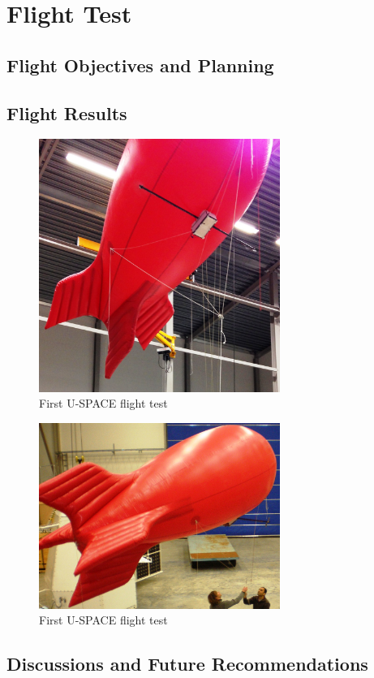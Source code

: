 \newpage
\chapter{Flight Test}
\label{chap:flight_test}

\section{Flight Objectives and Planning}

\section{Flight Results}

\begin{figure}[H]
\centering
\includegraphics[width=0.7\textwidth]{figures/fig_FlightTest1_1}
\caption{First U-SPACE flight test}
\label{fig:FlightTest1_1}
\end{figure}

\begin{figure}[H]
\centering
\includegraphics[width=0.7\textwidth]{figures/fig_FlightTest1_2}
\caption{First U-SPACE flight test}
\label{fig:FlightTest1_2}
\end{figure}




\section{Discussions and Future Recommendations}

